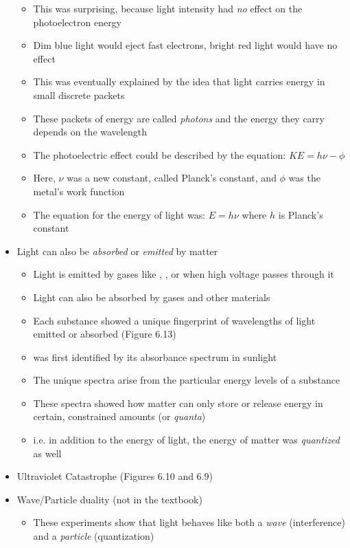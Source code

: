 \documentclass[12pt, openany, letterpaper]{memoir}
\begin{document}
\begin{itemize}
\begin{itemize}
		      \item This was surprising, because light intensity had \emph{no} effect on the photoelectron energy
		      \item Dim blue light would eject fast electrons, bright red light would have no effect
		      \item This was eventually explained by the idea that light carries energy in small discrete packets
		      \item These packets of energy are called \emph{photons} and the energy they carry depends on the wavelength
		      \item The photoelectric effect could be described by the equation: $KE = h\nu - \phi$
		      \item Here, $\nu$ was a new constant, called Planck's constant, and $\phi$ was the metal's work function
		      \item The equation for the energy of light was: $E=h\nu$ where $h$ is Planck's constant
	      \end{itemize}
	\item Light can also be \emph{absorbed} or \emph{emitted} by matter
	      \begin{itemize}
		      \item Light is emitted by gases like , , or  when high voltage passes through it
		      \item Light can also be absorbed by gases and other materials
		      \item Each substance showed a unique fingerprint of wavelengths of light emitted or absorbed (Figure 6.13)
		      \item {} was first identified by its absorbance spectrum in sunlight
		      \item The unique spectra arise from the particular energy levels of a substance
		      \item These spectra showed how matter can only store or release energy in certain, constrained amounts (or \emph{quanta})
		      \item i.e. in addition to the energy of light, the energy of matter was \emph{quantized} as well
	      \end{itemize}
  \item Ultraviolet Catastrophe (Figures 6.10 and 6.9)
	\item Wave/Particle duality (not in the textbook)
	      \begin{itemize}
		      \item These experiments show that light behaves like both a \emph{wave} (interference) and a \emph{particle} (quantization)

\end{itemize}
\end{itemize}
\end{document}
